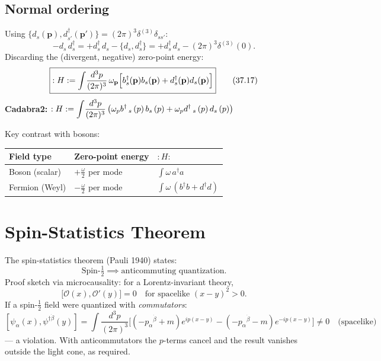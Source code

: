 \subsection{Normal ordering}

Using $\{d_s(\mathbf{p}),d^\dagger_{s'}(\mathbf{p}')\} = (2\pi)^3\delta^{(3)}\delta_{ss'}$:
\begin{equation}
  -d_s\,d^\dagger_s = +d^\dagger_s\,d_s - \{d_s,d^\dagger_s\}
  = +d^\dagger_s\,d_s - (2\pi)^3\delta^{(3)}(0).
\end{equation}
Discarding the (divergent, negative) zero-point energy:
\begin{equation}
  \boxed{:H: = \int\!\frac{d^3p}{(2\pi)^3}\,\omega_{\mathbf{p}}
  \Bigl[b^\dagger_s(\mathbf{p})b_s(\mathbf{p}) + d^\dagger_s(\mathbf{p})d_s(\mathbf{p})\Bigr]}
  \tag{37.17}
\end{equation}
\textbf{Cadabra2:} $:H: = \displaystyle\int\!\frac{d^3p}{(2\pi)^3}\,\bigl(\omega_{p} b^{\dagger}\,_{s}\left(p\right) b_{s}\left(p\right)\discretionary{}{}{}+\omega_{p} d^{\dagger}\,_{s}\left(p\right) d_{s}\left(p\right)\bigr)$

\medskip
Key contrast with bosons:
\begin{center}
\renewcommand{\arraystretch}{1.4}
\begin{tabular}{@{}lll@{}}
  \toprule
  Field type & Zero-point energy & $:H:$ \\
  \midrule
  Boson (scalar) & $+\frac{\omega}{2}$ per mode & $\int\omega\,a^\dagger a$ \\
  Fermion (Weyl) & $-\frac{\omega}{2}$ per mode & $\int\omega\,(b^\dagger b + d^\dagger d)$ \\
  \bottomrule
\end{tabular}
\end{center}

\section{Spin-Statistics Theorem}

The spin-statistics theorem (Pauli 1940) states:
\begin{equation}
  \text{Spin-}\tfrac{1}{2} \implies \text{anticommuting quantization}.
\end{equation}
Proof sketch via microcausality: for a Lorentz-invariant theory,
\[
  \bigl[\mathcal{O}(x),\mathcal{O}'(y)\bigr] = 0
  \quad\text{for spacelike }(x-y)^2>0.
\]
If a spin-$\frac{1}{2}$ field were quantized with \emph{commutators}:
\[
  [\psi_\alpha(x),\psi^{\dagger\dot\beta}(y)] = \int\!\frac{d^3p}{(2\pi)^3}
  \bigl[(-p_{\alpha}{}^{\dot\beta}+m)e^{ip(x-y)}
       -(-p_{\alpha}{}^{\dot\beta}-m)e^{-ip(x-y)}\bigr]
  \neq 0\quad\text{(spacelike)}
\]
--- a violation.  With anticommutators the $p$-terms cancel and the result
vanishes outside the light cone, as required.

